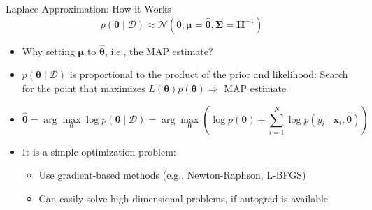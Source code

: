 \documentclass{beamer}
\begin{document}
\begin{frame}{Laplace Approximation: How it Works}
  \[p(\boldsymbol{\theta} \mid \mathcal{D}) \approx \mathcal{N}(\bm{\theta}; \bm{\mu} = \hat{\boldsymbol{\theta}}, \bm{\Sigma}=\mathbf{H}^{-1})\]
  \begin{itemize}
  \item Why setting $\bm{\mu}$ to $\hat{\boldsymbol{\theta}}$, i.e., the MAP estimate?
  \item $p(\bm{\theta} \mid \mathcal{D})$ is proportional to the product of the prior and likelihood:
    Search for the point that maximizes $L(\boldsymbol{\theta})p(\boldsymbol{\theta}) \Rightarrow$ MAP estimate
  \item[]
    \[
      \hat{\boldsymbol{\theta}} = \arg\max_{\boldsymbol{\theta}} \log p(\boldsymbol{\theta} \mid \mathcal{D}) = \arg\max_{\boldsymbol{\theta}} \left( \log p(\boldsymbol{\theta}) + \sum_{i=1}^N \log p(y_i \mid \mathbf{x}_i, \boldsymbol{\theta}) \right)
    \]
  \item It is a simple optimization problem:
    \begin{itemize}
    \item Use gradient-based methods (e.g., Newton-Raphson, L-BFGS)
    \item Can easily solve high-dimensional problems, if autograd is available
    \end{itemize}
\end{itemize}
\end{frame}
\end{document}
